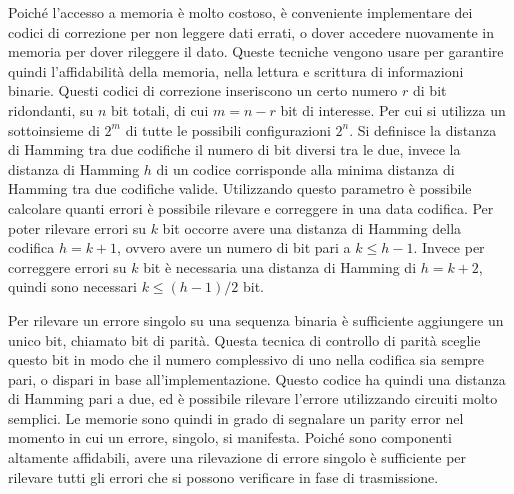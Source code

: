 \documentclass{article}
\numberwithin{equation}{subsection}
\begin{document}
Poiché l'accesso a memoria è molto costoso, è conveniente implementare dei codici di correzione per non leggere dati errati, o dover accedere nuovamente in memoria per dover rileggere il dato. Queste tecniche 
vengono usare per garantire quindi l'affidabilità della memoria, nella lettura e scrittura di informazioni binarie. Questi codici di correzione inseriscono un certo numero $r$ di bit ridondanti, su $n$ bit totali, 
di cui $m=n-r$ bit di interesse. Per cui si utilizza un sottoinsieme di $2^m$ di tutte le possibili configurazioni $2^n$. 
Si definisce la distanza di Hamming tra due codifiche il numero di bit diversi tra le due, invece la distanza di Hamming $h$ di un codice corrisponde alla minima distanza di Hamming tra due codifiche valide. 
Utilizzando questo parametro è possibile calcolare quanti errori è possibile rilevare e correggere in una data codifica. 
Per poter rilevare errori su $k$ bit occorre avere una distanza di Hamming della codifica $h=k+1$, ovvero avere un numero di bit pari a $k\leq h-1$. Invece per correggere errori su $k$ bit è necessaria una distanza di 
Hamming di $h=k+2$, quindi sono necessari $k\leq (h-1)/2$ bit. 


Per rilevare un errore singolo su una sequenza binaria è sufficiente aggiungere un unico bit, chiamato bit di parità. Questa tecnica di controllo di parità sceglie questo bit in modo che il numero complessivo di 
uno nella codifica sia sempre pari, o dispari in base all'implementazione. Questo codice ha quindi una distanza di Hamming pari a due, ed è possibile rilevare l'errore utilizzando circuiti molto semplici. 
Le memorie sono quindi in grado di segnalare un parity error nel momento in cui un errore, singolo, si manifesta. Poiché sono componenti altamente affidabili, avere una rilevazione di errore singolo è 
sufficiente per rilevare tutti gli errori che si possono verificare in fase di trasmissione. 
\end{document}
